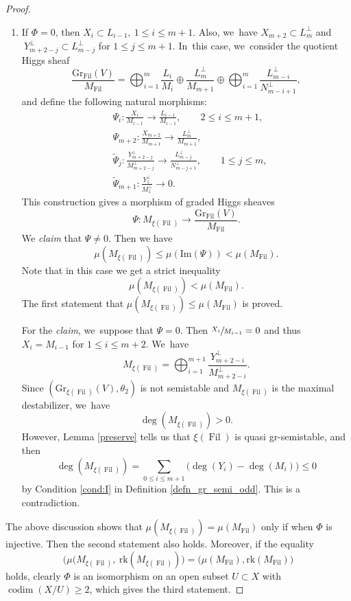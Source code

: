\documentclass[11pt]{article}
\numberwithin{equation}{section}
\newcommand{\grsemistable}{gr\nobreakdash-semi\-stable\xspace}
\DeclareMathOperator{\codim}{codim}
\DeclareMathOperator{\Filt}{Fil}
\newcommand{\rk}{\mathrm{rk}}
\newcommand{\Gr}{\mathrm{Gr}}
\theoremstyle{plain}
\theoremstyle{definition}
\begin{document}
\begin{proof}
\begin{enumerate}
\item If $\Phi= 0$, then $X_i\subset L_{i-1},\ 1\leq i\leq m+1$. Also, we~have $X_{m+2}\subset L_{m}^\perp$ and $\ Y_{m+2-j}^\perp \subset L_{m-j}^\perp$ for $1\leq j\leq m+1$. In~this case, we~consider the quotient Higgs sheaf
\[
\frac{\Gr_{\Filt}(V)}{M_{\Filt}}=\mathop{\bigoplus}_{i=1}^{m} \frac{L_i}{M_i}\oplus \frac{L_m^\perp}{M_{m+1}}\oplus \mathop{\bigoplus}_{i=1}^{m} \frac{L_{m-i}^\perp}{N_{m-i+1}^\perp},
\]
and define the following natural morphisms:
\begin{equation}
\begin{split}
&\Psi_i:\frac{X_i}{M_{i-1}}\to \frac{L_{i-1}}{M_{i-1}},\qquad 2\leq i\leq m+1,\\
&\Psi_{m+2}:\frac{X_{m+2}}{M_{m+1}}\to \frac{L_m^\perp}{M_{m+1}},\\
&\tilde{\Psi}_j:\frac{Y_{m+2-j}^\perp}{M_{m+2-j}^\perp}\to \frac{L_{m-j}^\perp}{N_{m-j+1}^\perp},\qquad 1\leq j\leq m,\\
&\tilde{\Psi}_{m+1}:\frac{Y_1^\perp}{M_1^\perp}\to 0.
\end{split}
\end{equation}
This construction gives a morphism of graded Higgs sheaves
\[
\Psi: M_{\xi(\Filt)}\to \frac{\Gr_{\Filt}(V)}{M_{\Filt}}.
\]
We \emph{claim} that $\Psi\neq 0$. Then we have
\[
\mu(M_{\xi(\Filt)})\leq \mu(\mathrm{Im}(\Psi)) <\mu(M_{\Filt}).
\]
Note that in this case we get a strict inequality
\[
\mu(M_{\xi(\Filt)})<\mu(M_{\Filt}).
\]
The first statement that $\mu(M_{\xi(\Filt)})\leq \mu(M_{\Filt})$ is proved.

For the \emph{claim}, we~suppose that $\Psi=0$. Then $\sfrac{X_i}{M_{i-1}}=0$ and thus $X_i = M_{i-1}$ for $1 \leq i \leq m+2$. We~have
\[
M_{\xi(\Filt)}=\mathop{\bigoplus}_{i=1}^{m+1} \frac{Y_{m+2-i}^\perp}{M_{m+2-i}^\perp}.
\]
Since $(\Gr_{\xi(\Filt)}(V), \theta_2)$ is not semistable and $M_{\xi(\Filt)}$ is the maximal destabilizer, we~have
\[
\deg(M_{\xi(\Filt)})>0.
\]
However, Lemma \ref{preserve} tells us that $\xi(\Filt)$ is quasi \grsemistable, and then
\begin{equation*}
\deg(M_{\xi(\Filt)})=\sum_{0\leq i\leq m+1}\big(\deg(Y_i)-\deg(M_i)\big)\leq 0
\end{equation*}
by Condition \eqref{cond:I} in Definition \ref{defn_gr_semi_odd}. This is a contradiction.
\end{enumerate}

The above discussion shows that $\mu(M_{\xi(\Filt)})= \mu(M_{\Filt})$ only if when $\Phi$ is injective. Then the second statement also holds. Moreover, if the equality
\[
\big(\mu(M_{\xi(\Filt)},\ \rk(M_{\xi(\Filt)})\big)= \big(\mu(M_{\Filt}),\rk(M_{\Filt})\big)
\]
holds, clearly $\Phi$ is an isomorphism on an open subset $U \subset X$ with $\codim(X/U) \geq 2$, which gives the third statement.
\end{proof}
\end{document}
